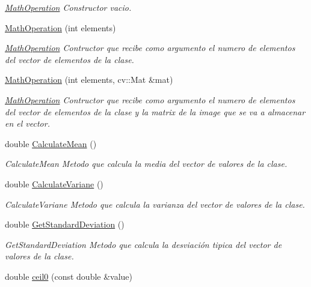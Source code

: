 \begin{DoxyCompactItemize}
\begin{DoxyCompactList}\small\item\em \hyperlink{class_math_operation}{Math\+Operation} Constructor vacio. \end{DoxyCompactList}\item 
\hyperlink{class_math_operation_a2231defda46af01e401c279d9966de98}{Math\+Operation} (int elements)
\begin{DoxyCompactList}\small\item\em \hyperlink{class_math_operation}{Math\+Operation} Contructor que recibe como argumento el numero de elementos del vector de elementos de la clase. \end{DoxyCompactList}\item 
\hyperlink{class_math_operation_a8d34860d914580697c1100d082e204cc}{Math\+Operation} (int elements, cv\+::\+Mat \&mat)
\begin{DoxyCompactList}\small\item\em \hyperlink{class_math_operation}{Math\+Operation} Contructor que recibe como argumento el numero de elementos del vector de elementos de la clase y la matrix de la image que se va a almacenar en el vector. \end{DoxyCompactList}\item 
double \hyperlink{class_math_operation_afd8a4ec3216a9c1ab0391a1a63002d0d}{Calculate\+Mean} ()
\begin{DoxyCompactList}\small\item\em Calculate\+Mean Metodo que calcula la media del vector de valores de la clase. \end{DoxyCompactList}\item 
double \hyperlink{class_math_operation_a161db6b912577cdcde192eabed812fd8}{Calculate\+Variane} ()
\begin{DoxyCompactList}\small\item\em Calculate\+Variane Metodo que calcula la varianza del vector de valores de la clase. \end{DoxyCompactList}\item 
double \hyperlink{class_math_operation_aab883a9fbdbfe23a539d98089ea27e64}{Get\+Standard\+Deviation} ()
\begin{DoxyCompactList}\small\item\em Get\+Standard\+Deviation Metodo que calcula la desviación tipica del vector de valores de la clase. \end{DoxyCompactList}\item 
double \hyperlink{class_math_operation_a56c06726344749b49944512947036689}{ceil0} (const double \&value)

\end{DoxyCompactItemize}
